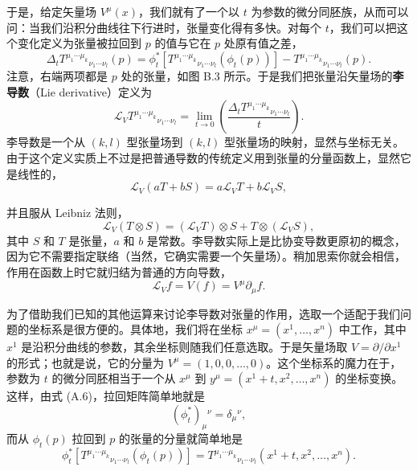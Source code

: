 于是，给定矢量场 $V^\mu(x)$，我们就有了一个以 $t$ 为参数的微分同胚族，从而可以问：当我们沿积分曲线往下行进时，张量变化得有多快。对每个 $t$，我们可以把这个变化定义为张量被拉回到 $p$ 的值与它在 $p$ 处原有值之差，
\begin{equation*}
\Delta_t T^{\mu_1\cdots\mu_k}{}_{\nu_1\cdots\nu_l}(p)
= \phi_t^*\left[T^{\mu_1\cdots\mu_k}{}_{\nu_1\cdots\nu_l}(\phi_t(p))\right]
- T^{\mu_1\cdots\mu_k}{}_{\nu_1\cdots\nu_l}(p).
\tag{B.4}
\end{equation*}
注意，右端两项都是 $p$ 处的张量，如图 B.3 所示。于是我们把张量沿矢量场的\textbf{李导数}（Lie derivative）定义为
\begin{equation*}
\mathcal{L}_V T^{\mu_1\cdots\mu_k}{}_{\nu_1\cdots\nu_l}
= \lim_{t \to 0} \left( \frac{\Delta_t T^{\mu_1\cdots\mu_k}{}_{\nu_1\cdots\nu_l}}{t} \right).
\tag{B.5}
\end{equation*}
李导数是一个从 $(k,l)$ 型张量场到 $(k,l)$ 型张量场的映射，显然与坐标无关。由于这个定义实质上不过是把普通导数的传统定义用到张量的分量函数上，显然它是线性的，
\begin{equation*}
\mathcal{L}_V (a T + b S) = a \mathcal{L}_V T + b \mathcal{L}_V S,
\tag{B.6}
\end{equation*}


并且服从 Leibniz 法则，
\begin{equation*}
\mathcal{L}_V (T \otimes S) = (\mathcal{L}_V T) \otimes S + T \otimes (\mathcal{L}_V S),
\tag{B.7}
\end{equation*}
其中 $S$ 和 $T$ 是张量，$a$ 和 $b$ 是常数。李导数实际上是比协变导数更原初的概念，因为它不需要指定联络（当然，它确实需要一个矢量场）。稍加思索你就会相信，作用在函数上时它就归结为普通的方向导数，
\begin{equation*}
\mathcal{L}_V f = V(f) = V^\mu \partial_\mu f.
\tag{B.8}
\end{equation*}

为了借助我们已知的其他运算来讨论李导数对张量的作用，选取一个适配于我们问题的坐标系是很方便的。具体地，我们将在坐标 $x^\mu = (x^1, \ldots, x^n)$ 中工作，其中 $x^1$ 是沿积分曲线的参数，其余坐标则随我们任意选取。于是矢量场取 $V = \partial/\partial x^1$ 的形式；也就是说，它的分量为 $V^\mu = (1, 0, 0, \ldots, 0)$。这个坐标系的魔力在于，参数为 $t$ 的微分同胚相当于一个从 $x^\mu$ 到 $y^\mu = (x^1 + t, x^2, \ldots, x^n)$ 的坐标变换。这样，由式 (A.6)，拉回矩阵简单地就是
\begin{equation*}
(\phi_t^*)_\mu{}^\nu = \delta_\mu{}^\nu,
\tag{B.9}
\end{equation*}
而从 $\phi_t(p)$ 拉回到 $p$ 的张量的分量就简单地是
\begin{equation*}
\phi_t^*\left[T^{\mu_1\cdots\mu_k}{}_{\nu_1\cdots\nu_l}(\phi_t(p))\right]
= T^{\mu_1\cdots\mu_k}{}_{\nu_1\cdots\nu_l}(x^1 + t, x^2, \ldots, x^n).
\tag{B.10}
\end{equation*}

